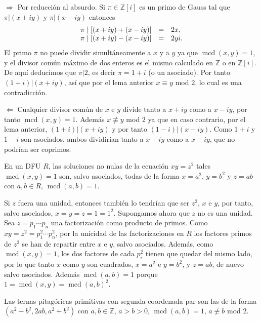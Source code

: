 
\(\Rightarrow\) Por reducción al absurdo. Si \(\pi\in\mathbb Z[i]\) es
un primo de Gauss tal que \(\pi|(x+iy)\) y \(\pi|(x-iy)\) entonces
\[\begin{array}{rcl}\pi\;|\;[(x+iy)+(x-iy)]&=&2x,\cr \pi\;|\;[(x+iy)-(x-iy)]&=&2yi.\end{array}\]
El primo \(\pi\) no puede dividir simultáneamente a \(x\) y a \(y\) ya
que \(\operatorname{mcd}(x,y)=1\), y el divisor común máximo de dos
enteros es el mismo calculado en \(\mathbb{Z}\) o en \(\mathbb{Z}[i]\).
De aquí deducimos que \(\pi|2\), es decir \(\pi=1+i\) (o un asociado).
Por tanto \((1+i)|(x+iy)\), así que por el lema anterior \(x\equiv y\)
mod \(2\), lo cual es una contradicción.

\(\Leftarrow\) Cualquier divisor común de \(x\) e \(y\) divide tanto a
\(x+iy\) como a \(x-iy\), por tanto \(\operatorname{mcd}(x,y)=1\).
Además \(x\not\equiv y\) mod \(2\) ya que en caso contrario, por el lema
anterior, \((1+i)|(x+iy)\) y por tanto \((1-i)|(x-iy)\). Como \(1+i\) y
\(1-i\) son asociados, ambos dividirían tanto a \(x+iy\) como a
\(x-iy\), que no podrían ser coprimos. 

\label{lem:DFU} En un DFU \(R\), las soluciones no nulas de
la ecuación \(xy=z^2\) tales \(\operatorname{mcd}(x,y)=1\) son, salvo
asociados, todas de la forma \(x=a^2\), \(y=b^2\) y \(z=ab\) con
\(a,b\in R\), \(\operatorname{mcd}(a,b)=1\). 


Si \(z\) fuera una unidad, entonces también lo tendrían que ser \(z^2\),
\(x\) e \(y\), por tanto, salvo asociados, \(x=y=z=1=1^2\). Supongamos
ahora que \(z\) no es una unidad. Sea \(z=p_1\cdots p_n\) una
factorización como producto de primos. Como
\(xy=z^2=p_1^2\cdots p_n^2\), por la unicidad de las factorizaciones en
\(R\) los factores primos de \(z^2\) se han de repartir entre \(x\) e
\(y\), salvo asociados. Además, como \(\operatorname{mcd}(x,y)=1\), los
dos factores de cada \(p_i^2\) tienen que quedar del mismo lado, por lo
que tanto \(x\) como \(y\) son cuadrados, \(x=a^2\) e \(y=b^2\), y
\(z=ab\), de nuevo salvo asociados. Además \(\operatorname{mcd}(a,b)=1\)
porque \(1=\operatorname{mcd}(x,y)=\operatorname{mcd}(a,b)^2\).


Las ternas pitagóricas primitivas con segunda coordenada par son las de
la forma \((a^2-b^2, 2ab, a^2+b^2)\) con \(a,b\in\mathbb Z\), \(a>b>0\),
\(\operatorname{mcd}(a,b)=1\), \(a\not\equiv b\) mod \(2\).

